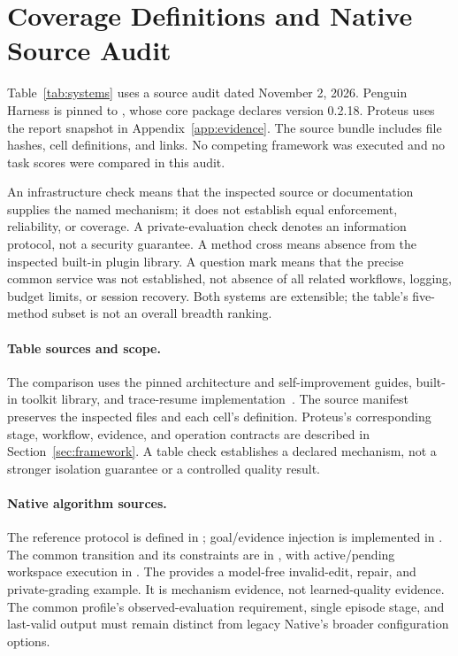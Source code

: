 \section{Coverage Definitions and Native Source Audit}
\label{app:systems}

Table~\ref{tab:systems} uses a source audit dated November 2, 2026. Penguin Harness is pinned to , whose core package declares version 0.2.18. Proteus uses the report snapshot in Appendix~\ref{app:evidence}. The source bundle includes file hashes, cell definitions, and links. No competing framework was executed and no task scores were compared in this audit.

An infrastructure check means that the inspected source or documentation supplies the named mechanism; it does not establish equal enforcement, reliability, or coverage. A private-evaluation check denotes an information protocol, not a security guarantee. A method cross means absence from the inspected built-in plugin library. A question mark means that the precise common service was not established, not absence of all related workflows, logging, budget limits, or session recovery. Both systems are extensible; the table's five-method subset is not an overall breadth ranking.

\paragraph{Table sources and scope.}
The comparison uses the pinned architecture and self-improvement guides, built-in toolkit library, and trace-resume implementation~\citep{penguin_software}. The source manifest preserves the inspected files and each cell's definition. Proteus's corresponding stage, workflow, evidence, and operation contracts are described in Section~\ref{sec:framework}. A table check establishes a declared mechanism, not a stronger isolation guarantee or a controlled quality result.

\paragraph{Native algorithm sources.}
The reference protocol is defined in ; goal/evidence injection is implemented in . The common transition and its constraints are in , with active/pending workspace execution in . The  provides a model-free invalid-edit, repair, and private-grading example. It is mechanism evidence, not learned-quality evidence. The common profile's observed-evaluation requirement, single episode stage, and last-valid output must remain distinct from legacy Native's broader configuration options.

